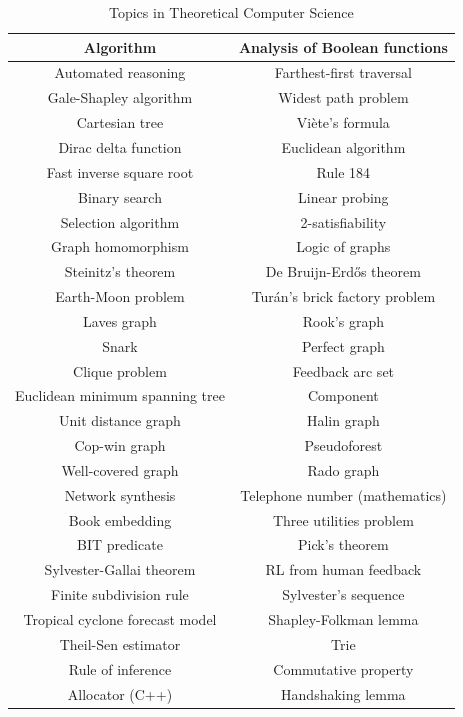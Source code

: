 \begin{table}
\begin{centering}
\begin{tabular}{|c|c|}
\hline 
Algorithm & Analysis of Boolean functions \tabularnewline
\hline 
Automated reasoning  & Farthest-first traversal \tabularnewline
\hline
Gale-Shapley algorithm & Widest path problem \tabularnewline
\hline
Cartesian tree & Viète's formula \tabularnewline
\hline
Dirac delta function & Euclidean algorithm \tabularnewline
\hline
Fast inverse square root & Rule 184 \tabularnewline
\hline
Binary search & Linear probing  \tabularnewline
\hline
Selection algorithm  & 2-satisfiability \tabularnewline
\hline
Graph homomorphism & Logic of graphs \tabularnewline
\hline
Steinitz's theorem & De Bruijn-Erdős theorem \tabularnewline
\hline
Earth-Moon problem & Turán's brick factory problem \tabularnewline
\hline
Laves graph & Rook's graph \tabularnewline
\hline
Snark & Perfect graph \tabularnewline
\hline
Clique problem & Feedback arc set \tabularnewline
\hline
Euclidean minimum spanning tree & Component \tabularnewline
\hline
Unit distance graph & Halin graph \tabularnewline
\hline
Cop-win graph & Pseudoforest \tabularnewline
\hline
Well-covered graph & Rado graph \tabularnewline
\hline
Network synthesis & Telephone number (mathematics) \tabularnewline
\hline
Book embedding & Three utilities problem \tabularnewline
\hline
BIT predicate & Pick's theorem \tabularnewline
\hline
Sylvester-Gallai theorem & RL from human feedback \tabularnewline
\hline
Finite subdivision rule & Sylvester's sequence \tabularnewline
\hline
Tropical cyclone forecast model & Shapley-Folkman lemma \tabularnewline
\hline
Theil-Sen estimator & Trie \tabularnewline
\hline
Rule of inference & Commutative property \tabularnewline
\hline
Allocator (C++) & Handshaking lemma \tabularnewline
\hline
\end{tabular}
\par\end{centering}
\caption{\label{tab:Topics-in-theoretical-computer-science}Topics in Theoretical Computer Science}
\end{table}


